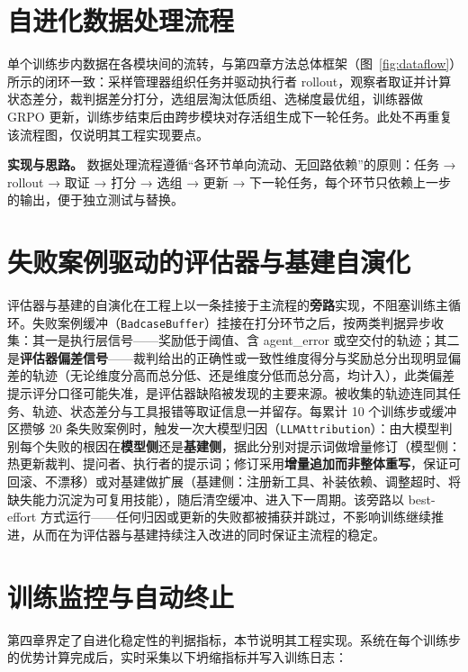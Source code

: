 \section{自进化数据处理流程}

单个训练步内数据在各模块间的流转，与第四章方法总体框架（图~\ref{fig:dataflow}）所示的闭环一致：采样管理器组织任务并驱动执行者 rollout，观察者取证并计算状态差分，裁判据差分打分，选组层淘汰低质组、选梯度最优组，训练器做 GRPO 更新，训练步结束后由跨步模块对存活组生成下一轮任务。此处不再重复该流程图，仅说明其工程实现要点。

\textbf{实现与思路。} 数据处理流程遵循“各环节单向流动、无回路依赖”的原则：任务 → rollout → 取证 → 打分 → 选组 → 更新 → 下一轮任务，每个环节只依赖上一步的输出，便于独立测试与替换。

\section{失败案例驱动的评估器与基建自演化}

评估器与基建的自演化在工程上以一条挂接于主流程的\textbf{旁路}实现，不阻塞训练主循环。失败案例缓冲（\texttt{BadcaseBuffer}）挂接在打分环节之后，按两类判据异步收集：其一是执行层信号——奖励低于阈值、含 agent\_error 或空交付的轨迹；其二是\textbf{评估器偏差信号}——裁判给出的正确性或一致性维度得分与奖励总分出现明显偏差的轨迹（无论维度分高而总分低、还是维度分低而总分高，均计入），此类偏差提示评分口径可能失准，是评估器缺陷被发现的主要来源。被收集的轨迹连同其任务、轨迹、状态差分与工具报错等取证信息一并留存。每累计 10 个训练步或缓冲区攒够 20 条失败案例时，触发一次大模型归因（\texttt{LLMAttribution}）：由大模型判别每个失败的根因在\textbf{模型侧}还是\textbf{基建侧}，据此分别对提示词做增量修订（模型侧：热更新裁判、提问者、执行者的提示词；修订采用\textbf{增量追加而非整体重写}，保证可回滚、不漂移）或对基建做扩展（基建侧：注册新工具、补装依赖、调整超时、将缺失能力沉淀为可复用技能），随后清空缓冲、进入下一周期。该旁路以 best-effort 方式运行——任何归因或更新的失败都被捕获并跳过，不影响训练继续推进，从而在为评估器与基建持续注入改进的同时保证主流程的稳定。

\section{训练监控与自动终止}

第四章界定了自进化稳定性的判据指标，本节说明其工程实现。系统在每个训练步的优势计算完成后，实时采集以下坍缩指标并写入训练日志：

